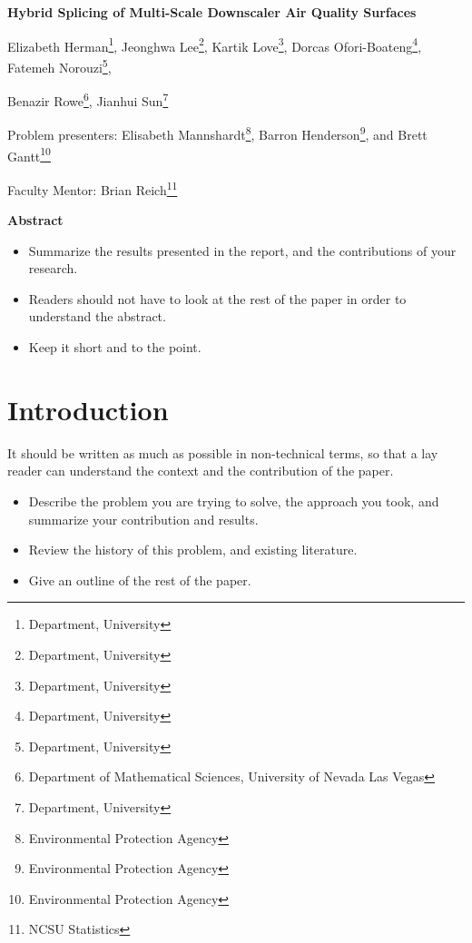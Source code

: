\documentclass[10pt]{article}
\begin{document}
\centerline{\large \bf Hybrid Splicing of Multi-Scale Downscaler Air Quality Surfaces}

\vspace{.1truein}

\def\thefootnote{\arabic{footnote}}
\begin{center}
  Elizabeth Herman\footnote{Department, University},
  Jeonghwa Lee\footnote{Department, University},
  Kartik Love\footnote{Department, University},
  Dorcas Ofori-Boateng\footnote{Department, University},
  Fatemeh Norouzi\footnote{Department, University},
  
  Benazir Rowe\footnote{Department of Mathematical Sciences, University of Nevada Las Vegas},
  Jianhui Sun\footnote{Department, University}
\end{center}


\begin{center}
Problem presenters: Elisabeth Mannshardt\footnote{Environmental Protection Agency}, Barron Henderson\footnote{Environmental Protection Agency}, and Brett Gantt\footnote{Environmental Protection Agency}

 
Faculty Mentor: Brian Reich\footnote{NCSU Statistics}
\end{center}


\vspace{.3truein}
\centerline{\bf Abstract}

\begin{itemize}
\item Summarize the results presented in the report, and the contributions
of your research.

\item Readers should not have to look at the rest of the paper in order to 
understand the abstract.

\item Keep it short and to the point.
\end{itemize}

\section{Introduction}
It should be written as much as possible in non-technical terms, so that a
lay reader can understand the context and the contribution of the paper.

\begin{itemize}
\item Describe the problem you are trying to solve, the approach
you took, and summarize your contribution and results.

\item Review the history of this problem, and existing literature.

\item Give an outline of the rest of the paper.
\end{itemize}
\end{document}
